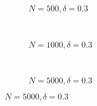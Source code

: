 \documentclass{beamer}
\begin{document}
%  
%  
%  
\begin{frame}
\begin{figure}[h]
  \scriptsize
  \begingroup
  \centering
  \begin{subfigure}[b]{0.31\textwidth}
\caption{\footnotesize $N=500, \delta = 0.3$}
  
  \end{subfigure}
  ~
  \begin{subfigure}[b]{0.31\textwidth}
    \caption{\footnotesize $N=1000, \delta = 0.3$} 
  
  \end{subfigure}
  ~
  \begin{subfigure}[b]{0.31\textwidth}
\caption{\footnotesize $N=5000, \delta = 0.3$}
  
  \end{subfigure}
\endgroup
\end{figure}
\end{frame}
\begin{frame}
  \begin{center}
    {}
  \end{center}
\end{frame}
\end{document}
